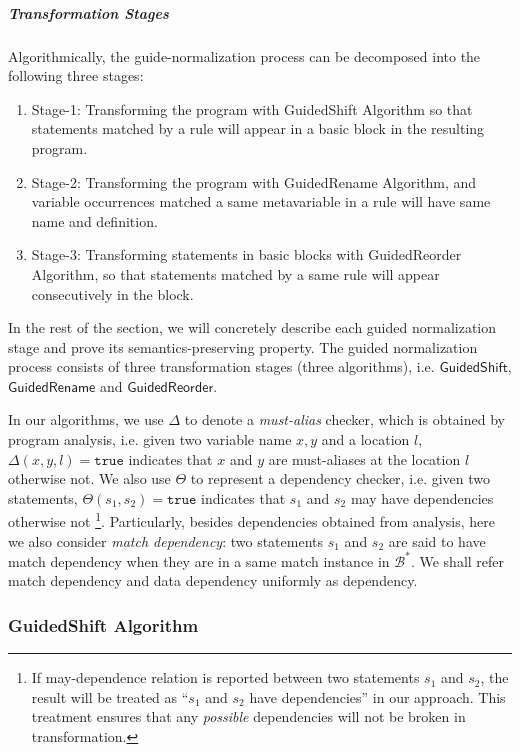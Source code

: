 \documentclass[letterpaper, USenglish]{lipics-v2016}
\theoremstyle{plain}
\begin{document}
\subparagraph*{Transformation Stages} Algorithmically, the guide-normalization process can be decomposed into the following three stages:
\begin{enumerate}\itemsep0pt
\item Stage-1: Transforming the program with \textsf{GuidedShift Algorithm} so that statements matched by a rule will appear in a basic block in the resulting program.
\item Stage-2: Transforming the program with \textsf{GuidedRename Algorithm}, and variable occurrences matched a same metavariable in a rule will have same name and definition.
\item Stage-3: Transforming statements in basic blocks with \textsf{GuidedReorder Algorithm}, so that statements matched by a same rule will appear consecutively in the block. 
\end{enumerate}

In the rest of the section, we will concretely describe each guided normalization stage and prove its semantics-preserving property. The guided normalization process consists of three transformation stages (three algorithms), i.e. $\mathsf{GuidedShift}$, $\mathsf{GuidedRename}$ and $\mathsf{GuidedReorder}$.

In our algorithms, we use $\Delta$ to denote a \emph{must-alias}
checker, which is obtained by program analysis, i.e. given two variable name $x,y$ and a location $l$,
$\Delta(x,y,l)=\mathtt{true}$ indicates that $x$ and $y$ are
must-aliases at the location $l$ otherwise not. We also use $\Theta$
to represent a dependency checker, i.e. given two statements,
$\Theta(s_1, s_2)=\mathtt{true}$ indicates that $s_1$ and $s_2$ may have
dependencies otherwise not \footnote{If may-dependence relation is reported between two statements $s_1$ and $s_2$, the result will be treated as ``$s_1$ and $s_2$ have dependencies'' in our approach. This treatment ensures that any \textit{possible} dependencies will not be broken in transformation.}. Particularly, besides dependencies obtained from analysis,
here we also consider \emph{match dependency}: two statements $s_1$ and $s_2$
are said to have match dependency when they are in a same match
instance in $\mathcal{B}^*$. We shall refer match dependency and data
dependency uniformly as dependency.

\subsubsection{GuidedShift Algorithm}
\end{document}
